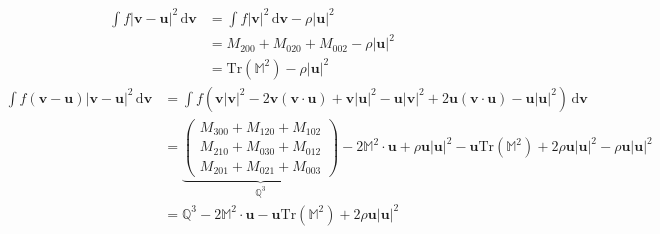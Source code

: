 \documentclass{article}
\begin{document}
\begin{align*}
    \int f |\bm{v} - \bm{u}|^2 \,\mathrm{d} \bm{v} &= \int f |\bm{v}|^2 \, \mathrm{d} \bm{v} - \rho |\bm{u}|^2 \\
                                                   &= M_{200} + M_{020} + M_{002} - \rho |\bm{u}|^2 \\
                                                   &= \mathrm{Tr}(\mathbb{M}^2) - \rho|\bm{u}|^2
\end{align*}
\begin{align*}
    \int f (\bm{v} - \bm{u}) |\bm{v} - \bm{u}|^2 \,\mathrm{d} \bm{v} &= \int f (\bm{v} |\bm{v}|^2 - 2\bm{v} (\bm{v} \cdot \bm{u}) + \bm{v} |\bm{u}|^2 - \bm{u}|\bm{v}|^2 + 2\bm{u}(\bm{v} \cdot \bm{u}) - \bm{u}|\bm{u}|^2)\,\mathrm{d} \bm{v} \\
                                                                     &= \underbrace{\begin{pmatrix}
                                                                         M_{300} + M_{120} + M_{102} \\
                                                                         M_{210} + M_{030} + M_{012} \\
                                                                         M_{201} + M_{021} + M_{003}
                                                                 \end{pmatrix}}_{\mathbb{Q}^3} - 2\mathbb{M}^2 \cdot \bm{u} + \rho \bm{u} |\bm{u}|^2 - \bm{u} \mathrm{Tr}(\mathbb{M}^2) + 2\rho \bm{u} |\bm{u}|^2 - \rho \bm{u} |\bm{u}|^2 \\
                                                                     &= \mathbb{Q}^3 - 2\mathbb{M}^2 \cdot \bm{u} - \bm{u} \mathrm{Tr} (\mathbb{M}^2) + 2\rho \bm{u} |\bm{u}|^2
\end{align*}
\end{document}
